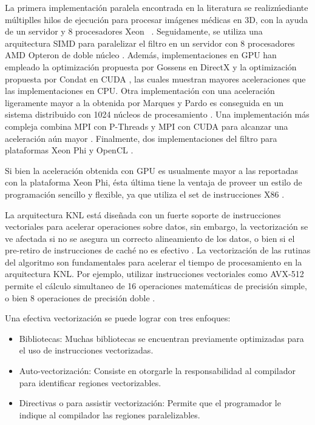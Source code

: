 {La primera implementaci\'on paralela encontrada en la literatura se realiz\' mediante m\'ultiplles hilos de ejecuci\'on para procesar im\'agenes m\'edicas en 3D, con la ayuda de un servidor y 8 procesadores Xeon \ \cite{coupe2006fast}. Seguidamente, se utiliza una arquitectura SIMD para paralelizar el filtro en un servidor con 8 procesadores AMD Opteron de doble n\'ucleo \cite{Darbon2008}. Adem\'as, implementaciones en GPU han empleado la optimizaci\'on propuesta por Gossens en DirectX \cite{marques2013implementation} y la optimizaci\'on propuesta por Condat en CUDA \cite{mingliang2016medical,goossens2010gpu}, las cuales muestran mayores aceleraciones que las implementaciones en CPU. Otra implementaci\'on con una aceleraci\'on ligeramente mayor a la obtenida por Marques y Pardo \cite{marques2013implementation} es conseguida en un sistema distribuido con 1024 n\'ucleos de procesamiento \cite{shi2015optimized}. Una implementaci\'on m\'as compleja combina MPI con P-Threads y MPI con CUDA para alcanzar una aceleraci\'on a\'un mayor \cite{nguyen2016medical}. Finalmente, dos implementaciones del filtro para plataformas Xeon Phi \cite{zhu2016parallel,huang2017parallel} y OpenCL \cite{zhu2016parallel}.

Si bien la aceleraci\'on obtenida con GPU es usualmente mayor a las reportadas con la plataforma Xeon Phi, \'esta \'ultima tiene la ventaja de proveer un estilo de programaci\'on sencillo y flexible, ya que utiliza el set de instrucciones X86 \cite{huang2017parallel}. 

La arquitectura KNL est\'a dise\~nada con un fuerte soporte de instrucciones vectoriales para acelerar operaciones sobre datos, sin embargo,  la vectorizaci\'on se ve afectada si no se asegura un correcto alineamiento de los datos, o bien si el pre-retiro de instrucciones de cach\'e no es efectivo \cite{Jeffers201617:vect}.
La vectorizaci\'on de las rutinas del algoritmo son fundamentales para acelerar el tiempo de procesamiento en la arquitectura KNL. Por ejemplo, utilizar instrucciones vectoriales como AVX-512 permite el c\'alculo simultaneo de 16 operaciones matem\'aticas de precisi\'on simple, o bien 8 operaciones de precisi\'on doble \cite{Jeffers201617:vect}.

Una efectiva vectorizaci\'on se puede lograr con tres enfoques:

\begin{itemize}
\item Bibliotecas: Muchas bibliotecas se encuentran previamente optimizadas para el uso de instrucciones vectorizadas. 
\item Auto-vectorizaci\'on: Consiste en otorgarle la responsabilidad al compilador para identificar regiones vectorizables.
\item Directivas o  para assistir vectorizaci\'on: Permite que el programador le indique al compilador las regiones paralelizables.
\end{itemize}
 
}
